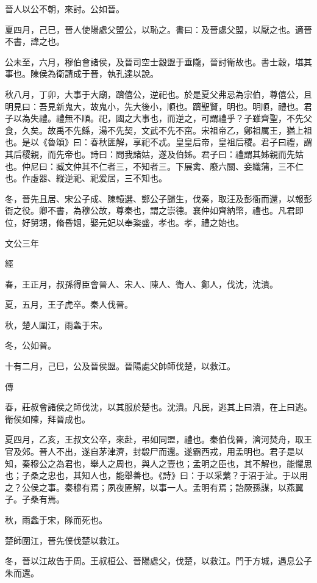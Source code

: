 \documentclass{ctexart}
\begin{document}
晉人以公不朝，來討。公如晉。

夏四月，己巳，晉人使陽處父盟公，以恥之。書曰：及晉處父盟，以厭之也。適晉不書，諱之也。

公未至，六月，穆伯會諸侯，及晉司空士縠盟于垂隴，晉討衛故也。書士縠，堪其事也。陳侯為衛請成于晉，執孔達以說。

秋八月，丁卯，大事于大廟，躋僖公，逆祀也。於是夏父弗忌為宗伯，尊僖公，且明見曰：吾見新鬼大，故鬼小，先大後小，順也。躋聖賢，明也。明順，禮也。君子以為失禮。禮無不順。祀，國之大事也，而逆之，可謂禮乎？子雖齊聖，不先父食，久矣。故禹不先鯀，湯不先契，文武不先不窋。宋祖帝乙，鄭祖厲王，猶上祖也。是以《魯頌》曰：春秋匪解，享祀不忒。皇皇后帝，皇祖后稷。君子曰禮，謂其后稷親，而先帝也。詩曰：問我諸姑，遂及伯姊。君子曰：禮謂其姊親而先姑也。仲尼曰：臧文仲其不仁者三，不知者三。下展禽、廢六關、妾織蒲，三不仁也。作虛器、縱逆祀、祀爰居，三不知也。

冬，晉先且居、宋公子成、陳轅選、鄭公子歸生，伐秦，取汪及彭衙而還，以報彭衙之役。卿不書，為穆公故，尊秦也，謂之崇德。襄仲如齊納幣，禮也。凡君即位，好舅甥，脩昏姻，娶元妃以奉粢盛，孝也。孝，禮之始也。





文公三年


經



春，王正月，叔孫得臣會晉人、宋人、陳人、衛人、鄭人，伐沈，沈潰。

夏，五月，王子虎卒。秦人伐晉。

秋，楚人圍江，雨螽于宋。

冬，公如晉。

十有二月，己巳，公及晉侯盟。晉陽處父帥師伐楚，以救江。

傳



春，莊叔會諸侯之師伐沈，以其服於楚也。沈潰。凡民，逃其上曰潰，在上曰逃。衛侯如陳，拜晉成也。

夏四月，乙亥，王叔文公卒，來赴，弔如同盟，禮也。秦伯伐晉，濟河焚舟，取王官及郊。晉人不出，遂自茅津濟，封殽尸而還。遂霸西戎，用孟明也。君子是以知，秦穆公之為君也，舉人之周也，與人之壹也；孟明之臣也，其不解也，能懼思也；子桑之忠也，其知人也，能舉善也。《詩》曰：于以采蘩？于沼于沚。于以用之？公侯之事。秦穆有焉；夙夜匪解，以事一人。孟明有焉；詒厥孫謀，以燕翼子。子桑有焉。

秋，雨螽于宋，隊而死也。

楚師圍江，晉先僕伐楚以救江。

冬，晉以江故告于周。王叔桓公、晉陽處父，伐楚，以救江。門于方城，遇息公子朱而還。
\end{document}
